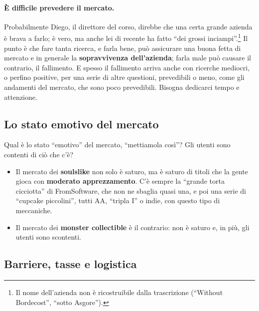 \paragraph{È difficile prevedere il mercato.} Probabilmente Diego, il
direttore del corso, direbbe che una certa grande azienda è brava a farlo; è
vero, ma anche lei di recente ha fatto ``dei grossi
inciampi''.\footnote{Il nome dell'azienda non è ricostruibile dalla
trascrizione (``Without Bordecost'', ``sotto Asgore'').} Il punto è che fare
tanta ricerca, e farla bene, può assicurare una buona fetta di mercato e in
generale la \textbf{sopravvivenza dell'azienda}; farla male può causare il
contrario, il fallimento. E spesso il fallimento arriva anche con ricerche
mediocri, o perfino positive, per una serie di altre questioni, prevedibili o
meno, come gli andamenti del mercato, che sono poco prevedibili. Bisogna
dedicarci tempo e attenzione.

\subsection{Lo stato emotivo del mercato}

Qual è lo stato ``emotivo'' del mercato, ``mettiamola così''? Gli utenti sono
contenti di ciò che c'è?
\begin{itemize}
  \item Il mercato dei \textbf{soulslike} non solo è saturo, ma è saturo di
        titoli che la gente gioca con \textbf{moderato apprezzamento}. C'è
        sempre la ``grande torta cicciotta'' di FromSoftware, che non ne
        sbaglia quasi una, e poi una serie di ``cupcake piccolini'', tutti AA,
        ``tripla I'' o indie, con questo tipo di meccaniche.
  \item Il mercato dei \textbf{monster collectible} è il contrario: non è
        saturo e, in più, gli utenti sono scontenti.
\end{itemize}

\subsection{Barriere, tasse e logistica}

